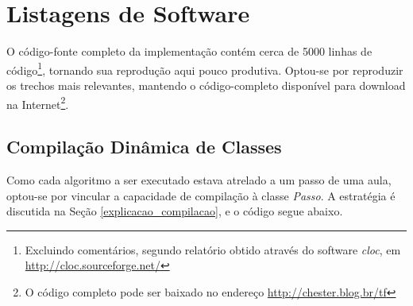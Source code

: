 \documentclass{abnt}
\begin{document}
\section{Listagens de Software}
\label{listagens}
O código-fonte completo da implementação contém cerca de 5000 linhas de código\footnote{Excluindo comentários, segundo relatório obtido através do software \textit{cloc}, em \url{http://cloc.sourceforge.net/}}, tornando sua reprodução aqui pouco produtiva. Optou-se por reproduzir os trechos mais relevantes, mantendo o código-completo disponível para download na Internet\footnote{O código completo pode ser baixado no endereço \url{http://chester.blog.br/tf}}.

\subsection{Compilação Dinâmica de Classes}

Como cada algoritmo a ser executado estava atrelado a um passo de uma aula, optou-se por vincular a capacidade de compilação à classe \textit{Passo}. A estratégia é discutida na Seção \ref{explicacao_compilacao}, e o código segue abaixo.
\end{document}
